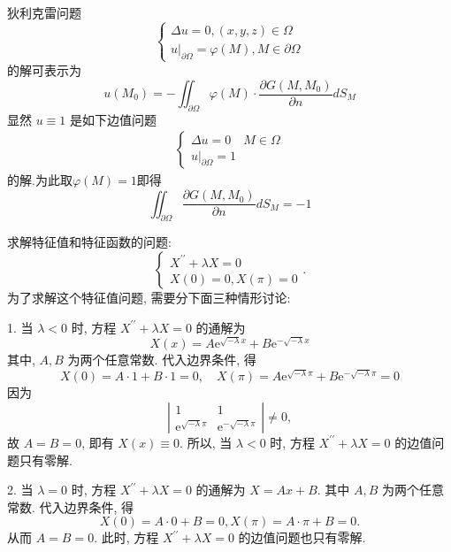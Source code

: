 \begin{questions}
{}
\begin{solution}
   狄利克雷问题 
$$\left\{\begin{array}{l}\Delta u=0,(x, y, z) \in \Omega \\ \left.u\right|_{\partial \Omega}=\varphi(M), M \in \partial \Omega\end{array}\right. $$
的解可表示为 
$$ u\left(M_{0}\right)=-\iint_{\partial \Omega} \varphi(M) \cdot \frac{\partial G\left(M, M_{0}\right)}{\partial n} d S_{M} $$
显然 $ u \equiv 1 $ 是如下边值问题
$$
\begin{array}{l}
\left\{\begin{array}{l}
\Delta u=0 \quad M \in \Omega\\
\left.u\right|_{\partial \Omega}=1
\end{array} \right.
\end{array} 
$$
的解.为此取$\varphi(M)=1$即得
$$
\iint_{\partial \Omega} \frac{\partial G\left(M, M_{0}\right)}{\partial n} d S_{M}=-1
$$
\end{solution}
\begin{solution}
求解特征值和特征函数的问题:
$$
\left\{\begin{array}{l}
X^{\prime \prime}+\lambda X=0 \\
X(0)=0, X(\pi)=0
\end{array} .\right.
$$
为了求解这个特征值问题, 需要分下面三种情形讨论:

1. 当 $ \lambda<0 $ 时, 方程 $ X^{\prime \prime}+\lambda X=0 $ 的通解为
$$
X(x)=A \mathrm{e}^{\sqrt{-\lambda} x}+B \mathrm{e}^{-\sqrt{-\lambda} x}
$$
其中, $ A, B $ 为两个任意常数. 代入边界条件, 得
$$
X(0)=A \cdot 1+B \cdot 1=0, \quad X(\pi)=A \mathrm{e}^{\sqrt{-\lambda} \pi}+B \mathrm{e}^{-\sqrt{-\lambda} \pi}=0
$$
因为
$$
\left|\begin{array}{cc}
1 & 1 \\
\mathrm{e}^{\sqrt{-\lambda }\pi}& \mathrm{e}^{-\sqrt{-\lambda } \pi}
\end{array}\right| \neq 0,
$$
故 $ A=B=0 $, 即有 $ X(x) \equiv 0 $.
所以, 当 $ \lambda<0 $ 时, 方程 $ X^{\prime \prime}+\lambda X=0 $ 的边值问题只有零解.

2. 当 $ \lambda=0 $ 时, 方程 $ X^{\prime \prime}+\lambda X=0 $ 的通解为 $ X=A x+B $. 其中 $ A, B $ 为两个任意常数. 代入边界条件, 得
$$
X(0)=A \cdot 0+B=0, X(\pi)=A \cdot \pi+B=0 .
$$
从而 $ A=B=0 $. 此时, 方程 $ X^{\prime \prime}+\lambda X=0 $ 的边值问题也只有零解.


\end{solution}
\end{questions}
